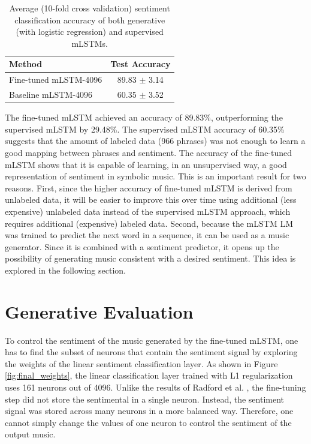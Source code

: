 \begin{table}[!h]
 \begin{center}
 \begin{tabular}{lc}
  \hline
  \textbf{Method} & \textbf{Test Accuracy} \\ \hline
  Fine-tuned mLSTM-4096 & 89.83 $\pm$ 3.14\\
  Baseline  mLSTM-4096 & 60.35 $\pm$ 3.52 \\
  \hline
 \end{tabular}
\end{center}
\caption{Average (10-fold cross validation) sentiment classification accuracy of both generative (with logistic regression) and supervised mLSTMs.}
 \label{tab:sent_anal}
\end{table}

The fine-tuned mLSTM achieved an accuracy of 89.83\%, outperforming the supervised mLSTM by 29.48\%. The supervised mLSTM accuracy of 60.35\% suggests that the amount of labeled data (966 phrases) was not enough to learn a good mapping between phrases and sentiment. The accuracy of the fine-tuned mLSTM shows that it is capable of learning, in an unsupervised way, a good representation of sentiment in symbolic music. This is an important result for two reasons. First, since the higher accuracy of fine-tuned mLSTM is derived from unlabeled data, it will be easier to improve this over time using additional (less expensive) unlabeled data instead of the supervised mLSTM approach, which requires additional (expensive) labeled data. Second, because the mLSTM LM was trained to predict the next word in a sequence, it can be used as a music generator. Since it is combined with a sentiment predictor, it opens up the possibility of generating music consistent with a desired sentiment. This idea is explored in the following section.

\section{Generative Evaluation}

To control the sentiment of the music generated by the fine-tuned mLSTM, one has to find the subset of neurons that contain the sentiment signal by exploring the weights of the linear sentiment classification layer. As shown in Figure \ref{fig:final_weights}, the linear classification layer trained with L1 regularization uses 161 neurons out of 4096. Unlike the results of Radford et al. \cite{radford_2017}, the fine-tuning step did not store the sentimental in a single neuron. Instead, the sentiment signal was stored across many neurons in a more balanced way. Therefore, one cannot simply change the values of one neuron to control the sentiment of the output music.

